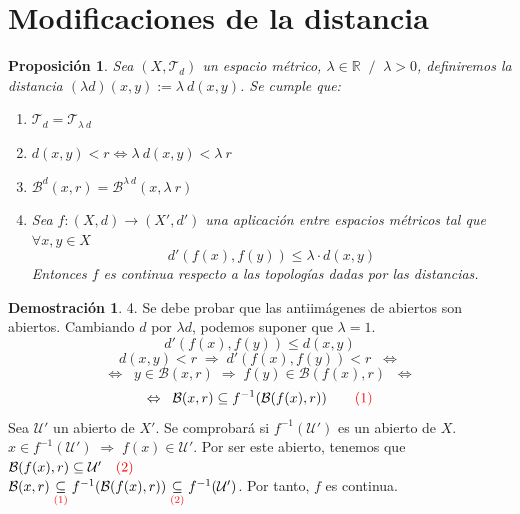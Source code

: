 \documentclass[12pt,twoside]{report}
\newcommand\mc[1]{\mathcal{#1}}
\theoremstyle{azul}
\theoremstyle{azul2}
\theoremstyle{plain}
\newtheorem*{prop}{Proposición}
\theoremstyle{definition}
\newtheorem*{dem}{Demostración}
\theoremstyle{remark}
\begin{document}
\section{Modificaciones de la distancia}
\begin{prop}
Sea $(X, \mc{T}_d)$ un espacio m{\'e}trico, $\lambda \in \mathbb{R} \;\; / \;\; \lambda > 0$, definiremos la distancia $ (\lambda d)(x,y)  :=  \lambda \: d(x,y)$. Se cumple que: \vspace{-3mm}
\begin{enumerate}
    \item $\mc{T}_d = \mc{T}_{\lambda \: d}$
    \item $d(x,y)<r \Leftrightarrow \lambda \: d(x,y) < \lambda \: r$
    \item $\mathcal{B}^{d}(x,r)=\mathcal{B}^{\lambda \: d}(x,\lambda \:r)$
    \item Sea $f: (X,d) \longrightarrow (X',d') $ una aplicación entre espacios métricos tal que $\forall x,y\in X$
    \vspace{-3mm}$$d'(f(x),f(y)) \leq \lambda \cdot d(x,y)$$
    Entonces $f$ es continua respecto a las topologías dadas por las distancias.
\end{enumerate}
\end{prop}

\begin{dem} 

4. Se debe probar que las antiimágenes de abiertos son abiertos. Cambiando $d$ por $\lambda d$, podemos suponer que $\lambda = 1$.
$$d'(f(x),f(y)) \leq d(x,y)$$
$$d(x,y) < r \; \Rightarrow \; d'(f(x),f(y)) < r \;\; \Leftrightarrow$$
$$\Leftrightarrow \;\; y \in \mc{B}(x,r) \; \Rightarrow \; f(y) \in \mc{B}(f(x),r) \;\; \Leftrightarrow$$
$$\Leftrightarrow \;\; \mc{B}(x,r) \subseteq f^{-1}(\mc{B}(f(x),r))\qquad \textcolor{red}{(1)}$$
Sea $\mc{U}'$ un abierto de $X'$. Se comprobará si $f^{-1}(\mc{U}')$ es un abierto de $X$.\\
$x \in f^{-1}(\mc{U}') \; \Rightarrow \; f(x) \in \mc{U}'$. Por ser este abierto, tenemos que $\mc{B}(f(x),r) \subseteq \mc{U}' \quad \textcolor{red}{(2)}$\\
$\mc{B}(x,r) \underset{\textcolor{red}{(1)}}{\subseteq} f^{-1}(\mc{B}(f(x),r)) \underset{\textcolor{red}{(2)}}{\subseteq} f^{-1}(\mc{U}')$. Por tanto, $f$ es continua.
\end{dem}
\end{document}
